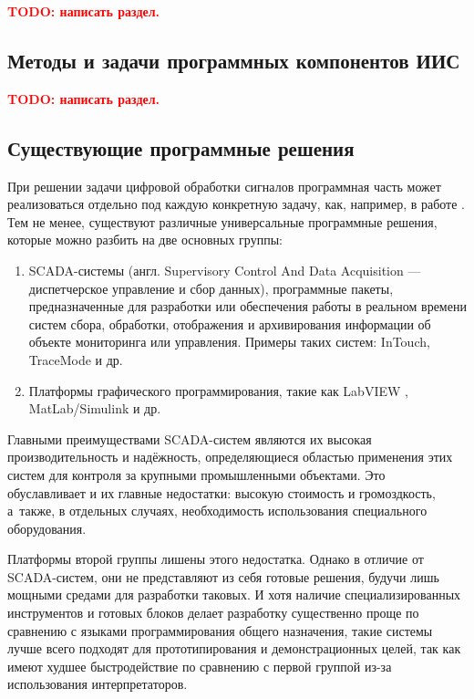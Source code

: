 \documentclass[a4paper, 14pt, titlepage]{extarticle}
\newcommand{\todo}[1]{\textbf{\textcolor{red}{TODO: #1}}}
\begin{document}
  \todo{написать раздел.}


  \subsection{Методы и задачи программных компонентов ИИС}

  \todo{написать раздел.}

  \subsection{Существующие программные решения}\label{ssec:existing}

  При решении задачи цифровой обработки сигналов программная часть может реализоваться отдельно под
  каждую конкретную задачу, как, например, в работе \cite{bak-autometry}.
  Тем не менее, существуют различные универсальные программные решения, которые можно разбить на две
  основных группы:
  \begin{enumerate}
    \item SCADA-системы (англ. Supervisory Control And Data Acquisition — диспетчерское управление и
      сбор данных), программные пакеты, предназначенные для разработки или обеспечения работы в
      реальном времени систем сбора, обработки, отображения и архивирования информации об объекте
      мониторинга или управления. \cite{boyer-scada}
      Примеры таких систем: InTouch, TraceMode и др.
    \item Платформы графического программирования, такие как LabVIEW \cite{lavrov-labview}, MatLab/Simulink и др.
  \end{enumerate}

  Главными преимуществами SCADA-систем являются их высокая производительность и надёжность,
  определяющиеся областью применения этих систем для контроля за крупными промышленными объектами.
  Это обуславливает и их главные недостатки: высокую стоимость и громоздкость, а~также, в отдельных
  случаях, необходимость использования специального оборудования.

  Платформы второй группы лишены этого недостатка. Однако в отличие от SCADA-систем, они не
  представляют из себя готовые решения, будучи лишь мощными средами для разработки таковых.
  И хотя наличие специализированных инструментов и готовых блоков делает разработку существенно
  проще по сравнению с языками программирования общего назначения, такие системы лучше всего
  подходят для прототипирования и демонстрационных целей, так как имеют худшее быстродействие по
  сравнению с первой группой из-за использования интерпретаторов.
\end{document}
